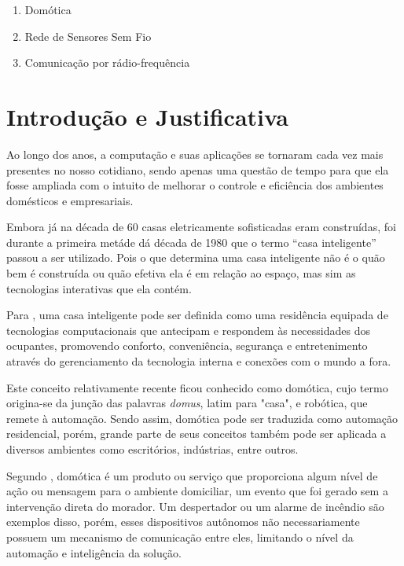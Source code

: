 \documentclass[
    12pt,               %
    a4paper,            %
    english,            %
    brazil,             %
    ]{article}
\begin{document}
        \begin{enumerate}
            \item Domótica
			\item Rede de Sensores Sem Fio
			\item Comunicação por rádio-frequência
        \end{enumerate}


\section{Introdução e Justificativa}
Ao longo dos anos, a computação e suas aplicações se tornaram cada vez mais presentes no nosso cotidiano, sendo apenas uma questão
de tempo para que ela fosse ampliada com o intuito de melhorar o controle e eficiência dos ambientes domésticos e empresariais.

Embora já na década de 60 casas eletricamente sofisticadas eram construídas, foi durante a primeira metáde dá década de 1980 que o
termo  ``casa inteligente'' passou a ser utilizado. Pois o que determina uma casa inteligente não é o quão bem é construída ou
quão efetiva ela é em relação ao espaço, mas sim as tecnologias interativas que ela contém. \cite{harper2003}

Para , uma casa inteligente pode ser definida como uma residência equipada de tecnologias computacionais
que antecipam e respondem às necessidades dos ocupantes, promovendo conforto, conveniência, segurança e entretenimento através do
gerenciamento da tecnologia interna e conexões com o mundo a fora.

Este conceito relativamente recente ficou conhecido como domótica, cujo termo origina-se da junção das palavras \textit{domus},
latim para "casa", e robótica, que remete à automação. Sendo assim, domótica pode ser traduzida como automação residencial, porém,
grande parte de seus conceitos também pode ser aplicada a diversos ambientes como escritórios, indústrias, entre outros.

Segundo , domótica é um produto ou serviço que proporciona algum nível de ação ou mensagem para o ambiente
domiciliar, um evento que foi gerado sem a intervenção direta do morador. Um despertador ou um alarme de incêndio são exemplos
disso, porém, esses dispositivos autônomos não necessariamente possuem um mecanismo de comunicação entre eles, limitando o nível
da automação e inteligência da solução.
\end{document}
